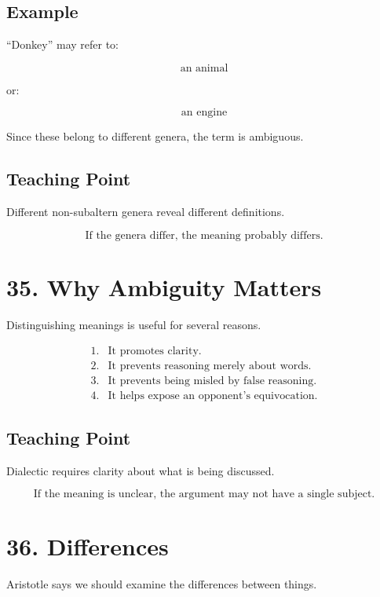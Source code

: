 \documentclass[12pt]{article}
\begin{document}
\subsection*{Example}

``Donkey'' may refer to:

\[
\text{an animal}
\]

or:

\[
\text{an engine}
\]

Since these belong to different genera, the term is ambiguous.

\subsection*{Teaching Point}

Different non-subaltern genera reveal different definitions.

\[
\boxed{
\text{If the genera differ, the meaning probably differs.}
}
\]

\section*{35. Why Ambiguity Matters}

Distinguishing meanings is useful for several reasons.

\[
\begin{array}{ll}
1. & \text{It promotes clarity.} \\
2. & \text{It prevents reasoning merely about words.} \\
3. & \text{It prevents being misled by false reasoning.} \\
4. & \text{It helps expose an opponent's equivocation.}
\end{array}
\]

\subsection*{Teaching Point}

Dialectic requires clarity about what is being discussed.

\[
\boxed{
\text{If the meaning is unclear, the argument may not have a single subject.}
}
\]

\section*{36. Differences}

Aristotle says we should examine the differences between things.
\end{document}
